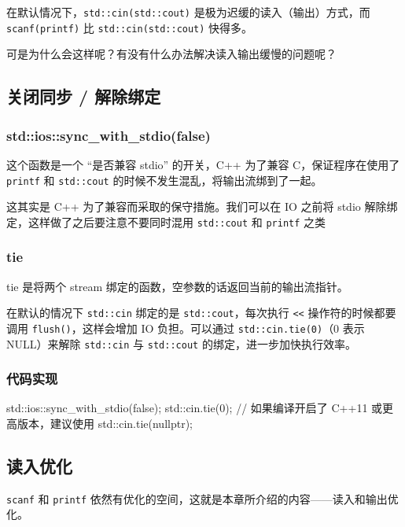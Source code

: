 
在默认情况下，\texttt{std::cin(std::cout)} 是极为迟缓的读入（输出）方式，而 \texttt{scanf(printf)} 比 \texttt{std::cin(std::cout)} 快得多。

可是为什么会这样呢？有没有什么办法解决读入输出缓慢的问题呢？

\subsection{关闭同步 / 解除绑定}

\subsubsection{std::ios::sync\_with\_stdio(false)}

这个函数是一个 “是否兼容 stdio” 的开关，C++ 为了兼容 C，保证程序在使用了 \texttt{printf} 和 \texttt{std::cout} 的时候不发生混乱，将输出流绑到了一起。

这其实是 C++ 为了兼容而采取的保守措施。我们可以在 IO 之前将 stdio 解除绑定，这样做了之后要注意不要同时混用 \texttt{std::cout} 和 \texttt{printf} 之类

\subsubsection{tie}

tie 是将两个 stream 绑定的函数，空参数的话返回当前的输出流指针。

在默认的情况下 \texttt{std::cin} 绑定的是 \texttt{std::cout}，每次执行 \texttt{<<} 操作符的时候都要调用 \texttt{flush()}，这样会增加 IO 负担。可以通过 \texttt{std::cin.tie(0)}（0 表示 NULL）来解除 \texttt{std::cin} 与 \texttt{std::cout} 的绑定，进一步加快执行效率。

\subsubsection{代码实现}

\begin{cppcode}
std::ios::sync_with_stdio(false);
std::cin.tie(0);
// 如果编译开启了 C++11 或更高版本，建议使用 std::cin.tie(nullptr);
\end{cppcode}

\subsection{读入优化}

\texttt{scanf} 和 \texttt{printf} 依然有优化的空间，这就是本章所介绍的内容——读入和输出优化。

